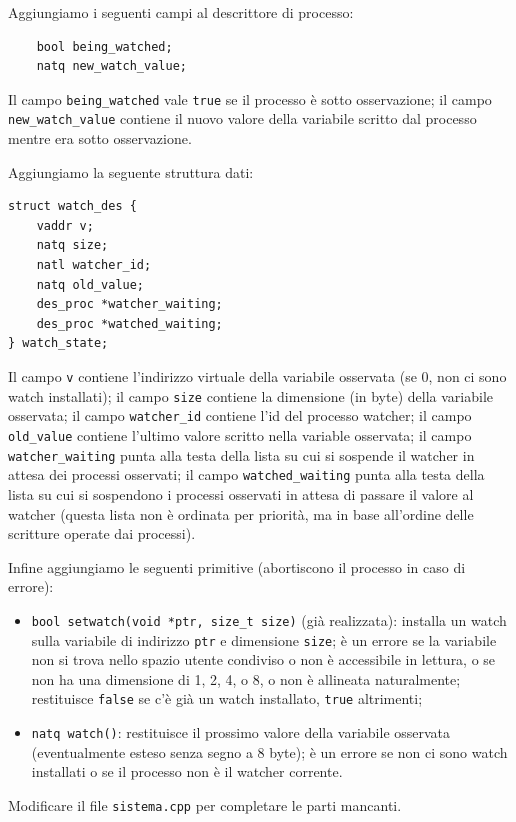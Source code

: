Aggiungiamo i seguenti campi al descrittore di processo:
\begin{verbatim}
    bool being_watched;
    natq new_watch_value;
\end{verbatim}
Il campo {\tt being\_watched} vale {\tt true} se il processo \`e sotto osservazione; il campo {\tt new\_watch\_value}
contiene il nuovo valore della variabile scritto dal processo mentre era sotto osservazione.

Aggiungiamo la seguente struttura dati:
\begin{verbatim}
struct watch_des {
    vaddr v;
    natq size;
    natl watcher_id;
    natq old_value;
    des_proc *watcher_waiting;
    des_proc *watched_waiting;
} watch_state;
\end{verbatim}
Il campo {\tt v} contiene l'indirizzo virtuale della variabile osservata (se 0, non ci sono watch installati);
il campo {\tt size} contiene la dimensione (in byte) della variabile osservata;
il campo {\tt watcher\_id} contiene l'id del processo watcher;
il campo {\tt old\_value} contiene l'ultimo valore scritto nella variable osservata;
il campo {\tt watcher\_waiting} punta alla testa della lista su cui si sospende il watcher in attesa dei processi osservati;
il campo {\tt watched\_waiting} punta alla testa della lista su cui si sospendono i processi osservati in attesa di passare il valore al watcher
(questa lista non \`e ordinata per priorit\`a, ma in base all'ordine delle scritture operate dai processi).

Infine aggiungiamo le seguenti primitive (abortiscono il processo in caso di errore):
\begin{itemize}
  \item {\tt bool setwatch(void *ptr, size\_t size)} (gi\`a realizzata): installa un watch sulla variabile di indirizzo {\tt ptr} e dimensione {\tt size};
  \`e un errore se la variabile non si trova nello spazio utente condiviso o non \`e accessibile in lettura, o se non ha una dimensione di 1, 2, 4, o 8, o
  non \`e allineata naturalmente; restituisce {\tt false} se c'\`e gi\`a un watch installato, {\tt true} altrimenti;
  \item {\tt natq watch()}: restituisce il prossimo valore della variabile osservata (eventualmente esteso senza segno a 8 byte); \`e un errore
  se non ci sono watch installati o se il processo non \`e il watcher corrente.
\end{itemize}

Modificare il file {\tt sistema.cpp} per completare le parti mancanti.
